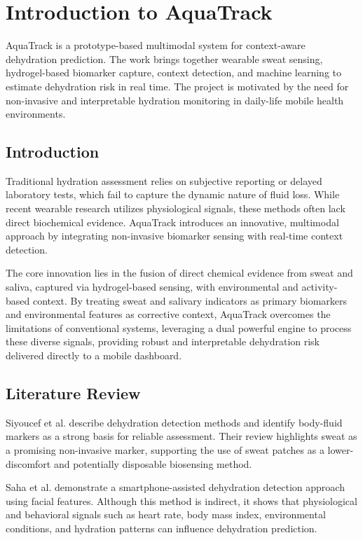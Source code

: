 \chapter{Introduction to AquaTrack}

AquaTrack is a prototype-based multimodal system for context-aware dehydration prediction. The work brings together wearable sweat sensing, hydrogel-based biomarker capture, context detection, and machine learning to estimate dehydration risk in real time. The project is motivated by the need for non-invasive and interpretable hydration monitoring in daily-life mobile health environments.

\section[Introduction]{\textbf{Introduction}}

Traditional hydration assessment relies on subjective reporting or delayed laboratory tests, which fail to capture the dynamic nature of fluid loss. While recent wearable research utilizes physiological signals, these methods often lack direct biochemical evidence. AquaTrack introduces an innovative, multimodal approach by integrating non-invasive biomarker sensing with real-time context detection.

The core innovation lies in the fusion of direct chemical evidence from sweat and saliva, captured via hydrogel-based sensing, with environmental and activity-based context. By treating sweat and salivary indicators as primary biomarkers and environmental features as corrective context, AquaTrack overcomes the limitations of conventional systems, leveraging a dual powerful engine to process these diverse signals, providing robust and interpretable dehydration risk delivered directly to a mobile dashboard.

\section[Literature Review]{\textbf{Literature Review}}

Siyoucef et al. describe dehydration detection methods and identify body-fluid markers as a strong basis for reliable assessment. Their review highlights sweat as a promising non-invasive marker, supporting the use of sweat patches as a lower-discomfort and potentially disposable biosensing method.

Saha et al. demonstrate a smartphone-assisted dehydration detection approach using facial features. Although this method is indirect, it shows that physiological and behavioral signals such as heart rate, body mass index, environmental conditions, and hydration patterns can influence dehydration prediction.

